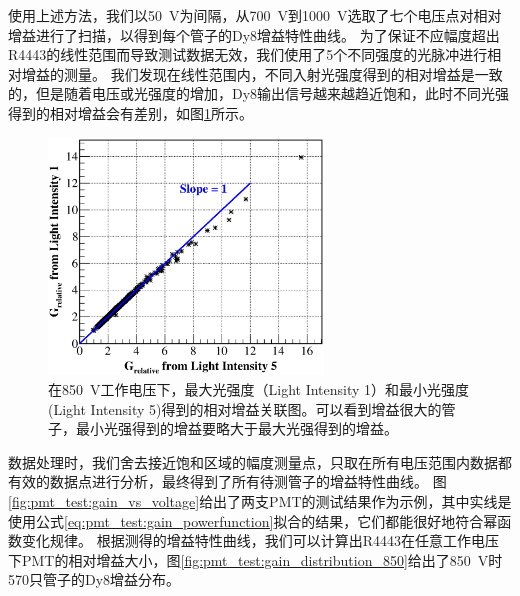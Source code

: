 使用上述方法，我们以\SI{50}{V}为间隔，从\SI{700}{V}到\SI{1000}{V}选取了七个电压点对相对增益进行了扫描，以得到每个管子的Dy8增益特性曲线。
为了保证不应幅度超出R4443的线性范围而导致测试数据无效，我们使用了5个不同强度的光脉冲进行相对增益的测量。
我们发现在线性范围内，不同入射光强度得到的相对增益是一致的，但是随着电压或光强度的增加，Dy8输出信号越来越趋近饱和，此时不同光强得到的相对增益会有差别，如图\ref{fig:pmt_test:gain_twointensity_correlation}所示。
\begin{figure}[htbp]
	\centering
	\includegraphics[width=0.65\textwidth]{chap/pmt_test/fig/gain_twointensity_correlation.eps}
	\caption{在\SI{850}{V}工作电压下，最大光强度（Light Intensity 1）和最小光强度(Light Intensity 5)得到的相对增益关联图。可以看到增益很大的管子，最小光强得到的增益要略大于最大光强得到的增益。}
	\label{fig:pmt_test:gain_twointensity_correlation}
\end{figure}
数据处理时，我们舍去接近饱和区域的幅度测量点，只取在所有电压范围内数据都有效的数据点进行分析，最终得到了所有待测管子的增益特性曲线。
图\ref{fig:pmt_test:gain_vs_voltage}给出了两支PMT的测试结果作为示例，其中实线是使用公式\ref{eq:pmt_test:gain_powerfunction}拟合的结果，它们都能很好地符合幂函数变化规律。
根据测得的增益特性曲线，我们可以计算出R4443在任意工作电压下PMT的相对增益大小，图\ref{fig:pmt_test:gain_distribution_850}给出了\SI{850}{V}时570只管子的Dy8增益分布。
